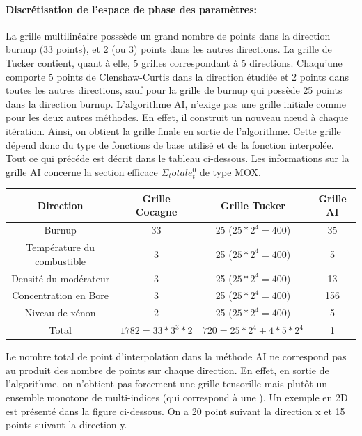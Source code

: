 \paragraph{Discrétisation de l'espace de phase des paramètres:}
La grille multilinéaire posssède un grand nombre de points dans la direction burnup (33 points), et 2 (ou 3) points
dans les autres directions. La grille de Tucker contient, quant à elle, 5 grilles correspondant à 5 directions.
Chaqu'une comporte 5 points de Clenshaw-Curtis dans la direction étudiée et 2 points dans toutes les autres directions, sauf
pour la grille de burnup qui possède 25 points dans la direction burnup.
L'algorithme AI, n'exige pas une grille initiale comme pour les deux autres méthodes. En effet, il construit
un nouveau nœud à chaque itération. Ainsi, on obtient la grille finale en sortie de l'algorithme. Cette grille dépend
donc du type de fonctions de base utilisé et de la fonction interpolée.\\
Tout ce qui précéde est décrit dans le tableau ci-dessous. Les informations sur la grille AI concerne la section efficace $\Sigma_totale_t^0$
de type MOX.
\begin{center}
\begin{tabular}{|*{4}{c|}}
	\hline
	Direction 											& Grille Cocagne  			& Grille Tucker 					 & Grille AI \\
	\hline
	Burnup 			 										& 33 										& 25 ($25*2^4 = 400$) 		 & 	35				\\
	\hline
	Température du combustible			& 3 										& 25 ($25*2^4 = 400$)			 & 	5				 	\\
	\hline
	Densité du modérateur				 		& 3											& 25 ($25*2^4 = 400$) 		 & 	13				\\
	\hline
	Concentration en Bore						& 3 										& 25 ($25*2^4 = 400$)			 & 	156				\\
	\hline
	Niveau de xénon									& 2 										& 25 ($25*2^4 = 400$)			 & 	5				 	\\
	\hline
	Total														& $1782 = 33 * 3^3 * 2$	& $720 = 25*2^4 + 4*5*2^4$ & 	1				 	\\
	\hline
\end{tabular}
\end{center}
Le nombre total de point d'interpolation dans la méthode AI ne correspond pas au produit des nombre de points sur chaque direction.
En effet, en sortie de l'algorithme, on n'obtient pas forcement une grille tensorille mais plutôt un ensemble monotone de multi-indices (qui correspond à une ).
Un exemple en 2D est présenté dans la figure ci-dessous. On a 20 point suivant la direction x et 15 points suivant la direction y.
